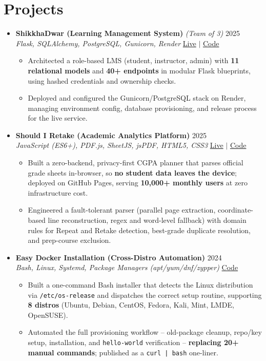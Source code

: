 \documentclass[a4paper]{article}
\newcommand{\resumeItem}[1]{
  \item\small{
    {#1 \vspace{-2pt}}
  }
}
\newcommand{\resumeItemListStart}{\begin{itemize}}
\newcommand{\resumeItemListEnd}{\end{itemize}\vspace{-5pt}}
\begin{document}
\section{Projects}
  \begin{itemize}[leftmargin=0.15in, label={}, itemsep=6pt]

    \item
    \textbf{ShikkhaDwar (Learning Management System)} \textit{\small (Team of 3)} \hfill 2025\\
    \small\textit{Flask, SQLAlchemy, PostgreSQL, Gunicorn, Render} \hfill
    \href{https://shikkhadwar-81r2.onrender.com/}{Live} $|$
    \href{https://github.com/nihal-kabir/ShikkhaDwar}{Code}
    \vspace{-5pt}
    \resumeItemListStart
      \resumeItem{Architected a role-based LMS (student, instructor, admin) with \textbf{11 relational models} and \textbf{40+ endpoints} in modular Flask blueprints, using hashed credentials and ownership checks.}
      \resumeItem{Deployed and configured the Gunicorn/PostgreSQL stack on Render, managing environment config, database provisioning, and release process for the live service.}
    \resumeItemListEnd

    \item
    \textbf{Should I Retake (Academic Analytics Platform)} \hfill 2025\\
    \small\textit{JavaScript (ES6+), PDF.js, SheetJS, jsPDF, HTML5, CSS3} \hfill
    \href{https://badhon495.github.io/should-i-retake/}{Live} $|$
    \href{https://github.com/badhon495/should-i-retake}{Code}
    \vspace{-5pt}
    \resumeItemListStart
      \resumeItem{Built a zero-backend, privacy-first CGPA planner that parses official grade sheets in-browser, so \textbf{no student data leaves the device}; deployed on GitHub Pages, serving \textbf{10,000+ monthly users} at zero infrastructure cost.}
      \resumeItem{Engineered a fault-tolerant parser (parallel page extraction, coordinate-based line reconstruction, regex and word-level fallback) with domain rules for Repeat and Retake detection, best-grade duplicate resolution, and prep-course exclusion.}
    \resumeItemListEnd

    \item
    \textbf{Easy Docker Installation (Cross-Distro Automation)} \hfill 2024\\
    \small\textit{Bash, Linux, Systemd, Package Managers (apt/yum/dnf/zypper)} \hfill
    \href{https://github.com/badhon495/Easy_Docker_Installation}{Code}
    \vspace{-5pt}
    \resumeItemListStart
      \resumeItem{Built a one-command Bash installer that detects the Linux distribution via \texttt{/etc/os-release} and dispatches the correct setup routine, supporting \textbf{8 distros} (Ubuntu, Debian, CentOS, Fedora, Kali, Mint, LMDE, OpenSUSE).}
      \resumeItem{Automated the full provisioning workflow -- old-package cleanup, repo/key setup, installation, and \texttt{hello-world} verification -- \textbf{replacing 20+ manual commands}; published as a \texttt{curl | bash} one-liner.}
    \resumeItemListEnd

  \end{itemize}
\end{document}
